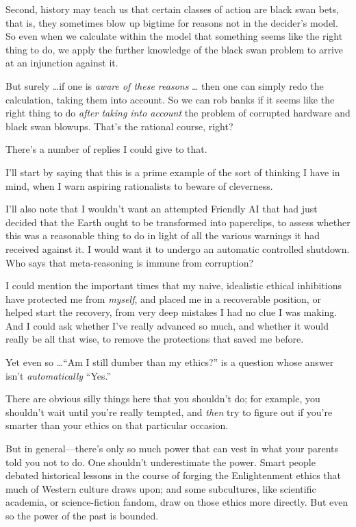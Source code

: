 {
 Second, history may teach us that certain classes of action are
black swan bets, that is, they sometimes blow up bigtime for reasons
not in the decider's model. So even when we calculate
within the model that something seems like the right thing to do, we
apply the further knowledge of the black swan problem to arrive at an
injunction against it.}

{
 But surely \ldots if one is \textit{aware of these reasons} \ldots
then one can simply redo the calculation, taking them into account. So
we can rob banks if it seems like the right thing to do \textit{after
taking into account} the problem of corrupted hardware and black swan
blowups. That's the rational course, right?}

{
 There's a number of replies I could give to that.}

{
 I'll start by saying that this is a prime example
of the sort of thinking I have in mind, when I warn aspiring
rationalists to beware of cleverness.}

{
 I'll also note that I wouldn't
want an attempted Friendly AI that had just decided that the Earth
ought to be transformed into paperclips, to assess whether this was a
reasonable thing to do in light of all the various warnings it had
received against it. I would want it to undergo an automatic controlled
shutdown. Who says that meta-reasoning is immune from corruption?}

{
 I could mention the important times that my naive, idealistic
ethical inhibitions have protected me from \textit{myself}, and placed
me in a recoverable position, or helped start the recovery, from very
deep mistakes I had no clue I was making. And I could ask whether
I've really advanced so much, and whether it would
really be all that wise, to remove the protections that saved me
before.}

{
 Yet even so \ldots ``Am I still dumber than my
ethics?'' is a question whose answer
isn't \textit{automatically}
``Yes.''}

{
 There are obvious silly things here that you
shouldn't do; for example, you
shouldn't wait until you're really
tempted, and \textit{then} try to figure out if you're
smarter than your ethics on that particular occasion.}

{
 But in general---there's only so much power that
can vest in what your parents told you not to do. One
shouldn't underestimate the power. Smart people debated
historical lessons in the course of forging the Enlightenment ethics
that much of Western culture draws upon; and some subcultures, like
scientific academia, or science-fiction fandom, draw on those ethics
more directly. But even so the power of the past is bounded.}

